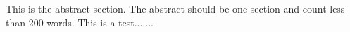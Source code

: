 This is the abstract section. The abstract should be one section and count less than 200 words. This is a test.......